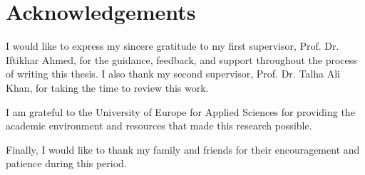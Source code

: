 \chapter*{Acknowledgements}

I would like to express my sincere gratitude to my first supervisor, Prof. Dr. Iftikhar Ahmed, for the guidance, feedback, and support throughout the process of writing this thesis. I also thank my second supervisor, Prof. Dr. Talha Ali Khan, for taking the time to review this work.

I am grateful to the University of Europe for Applied Sciences for providing the academic environment and resources that made this research possible.

Finally, I would like to thank my family and friends for their encouragement and patience during this period.
